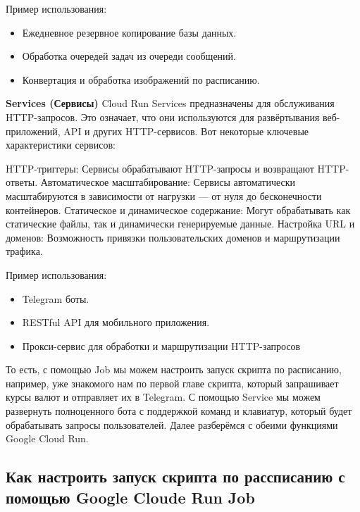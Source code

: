 \documentclass[
]{book}
\providecommand{\tightlist}{%
  \setlength{\itemsep}{0pt}\setlength{\parskip}{0pt}}
\begin{document}
Пример использования:

\begin{itemize}
\tightlist
\item
  Ежедневное резервное копирование базы данных.
\item
  Обработка очередей задач из очереди сообщений.
\item
  Конвертация и обработка изображений по расписанию.
\end{itemize}

\textbf{Services (Сервисы)}
Cloud Run Services предназначены для обслуживания HTTP-запросов. Это означает, что они используются для развёртывания веб-приложений, API и других HTTP-сервисов. Вот некоторые ключевые характеристики сервисов:

HTTP-триггеры: Сервисы обрабатывают HTTP-запросы и возвращают HTTP-ответы.
Автоматическое масштабирование: Сервисы автоматически масштабируются в зависимости от нагрузки --- от нуля до бесконечности контейнеров.
Статическое и динамическое содержание: Могут обрабатывать как статические файлы, так и динамически генерируемые данные.
Настройка URL и доменов: Возможность привязки пользовательских доменов и маршрутизации трафика.

Пример использования:

\begin{itemize}
\tightlist
\item
  Telegram боты.
\item
  RESTful API для мобильного приложения.
\item
  Прокси-сервис для обработки и маршрутизации HTTP-запросов
\end{itemize}

То есть, с помощью Job мы можем настроить запуск скрипта по расписанию, например, уже знакомого нам по первой главе скрипта, который запрашивает курсы валют и отправляет их в Telegram. С помощью Service мы можем развернуть полноценного бота с поддержкой команд и клавиатур, который будет обрабатывать запросы пользователей. Далее разберёмся с обеими функциями Google Cloud Run.

\subsection{Как настроить запуск скрипта по рассписанию с помощью Google Cloude Run Job}\label{ux43aux430ux43a-ux43dux430ux441ux442ux440ux43eux438ux442ux44c-ux437ux430ux43fux443ux441ux43a-ux441ux43aux440ux438ux43fux442ux430-ux43fux43e-ux440ux430ux441ux441ux43fux438ux441ux430ux43dux438ux44e-ux441-ux43fux43eux43cux43eux449ux44cux44e-google-cloude-run-job}
\end{document}
